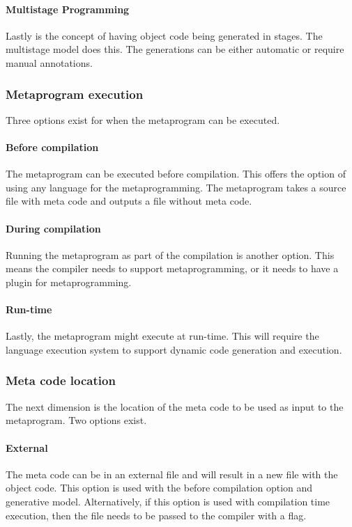\paragraph{Multistage Programming}
Lastly is the concept of having object code being generated in stages.
The multistage model does this.
The generations can be either automatic or require manual annotations. \cite{sheard_01_01, taha_04_01}

\subsubsection{Metaprogram execution}
Three options exist for when the metaprogram can be executed.

\paragraph{Before compilation}
The metaprogram can be executed before compilation.
This offers the option of using any language for the metaprogramming.
The metaprogram takes a source file with meta code and outputs a file without meta code. \cite{savidis_19_01}

\paragraph{During compilation}
Running the metaprogram as part of the compilation is another option.
This means the compiler needs to support metaprogramming, or it needs to have a plugin for metaprogramming. \cite{savidis_19_01}

\paragraph{Run-time}
Lastly, the metaprogram might execute at run-time.
This will require the language execution system to support dynamic code generation and execution. \cite{savidis_19_01}

\subsubsection{Meta code location}
The next dimension is the location of the meta code to be used as input to the metaprogram.
Two options exist.

\paragraph{External}
The meta code can be in an external file and will result in a new file with the object code.
This option is used with the before compilation option and generative model.
Alternatively, if this option is used with compilation time execution, then the file needs to be passed to the compiler with a flag. \cite{savidis_19_01}

